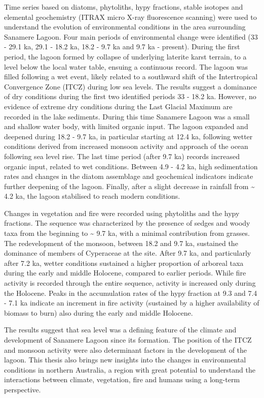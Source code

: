 \documentclass[
  12pt,
]{book}
\begin{document}
Time series based on diatoms, phytoliths, hypy fractions, stable isotopes and elemental geochemistry (ITRAX micro X-ray fluorescence scanning) were used to understand the evolution of environmental conditions in the area surrounding Sanamere Lagoon. Four main periods of environmental change were identified (33 - 29.1 ka, 29.1 - 18.2 ka, 18.2 - 9.7 ka and 9.7 ka - present). During the first period, the lagoon formed by collapse of underlying laterite karst terrain, to a level below the local water table, ensuing a continuous record. The lagoon was filled following a wet event, likely related to a southward shift of the Intertropical Convergence Zone (ITCZ) during low sea levels. The results suggest a dominance of dry conditions during the first two identified periods 33 - 18.2 ka. However, no evidence of extreme dry conditions during the Last Glacial Maximum are recorded in the lake sediments. During this time Sanamere Lagoon was a small and shallow water body, with limited organic input. The lagoon expanded and deepened during 18.2 - 9.7 ka, in particular starting at 12.4 ka, following wetter conditions derived from increased monsoon activity and approach of the ocean following sea level rise. The last time period (after 9.7 ka) records increased organic input, related to wet conditions. Between 4.9 - 4.2 ka, high sedimentation rates and changes in the diatom assemblage and geochemical indicators indicate further deepening of the lagoon. Finally, after a slight decrease in rainfall from \textasciitilde{} 4.2 ka, the lagoon stabilised to reach modern conditions.

Changes in vegetation and fire were recorded using phytoliths and the hypy fractions. The sequence was characterized by the presence of sedges and woody taxa from the beginning to \textasciitilde{} 9.7 ka, with a minimal contribution from grasses. The redevelopment of the monsoon, between 18.2 and 9.7 ka, sustained the dominance of members of Cyperaceae at the site. After 9.7 ka, and particularly after 7.2 ka, wetter conditions sustained a higher proportion of arboreal taxa during the early and middle Holocene, compared to earlier periods. While fire activity is recorded through the entire sequence, activity is increased only during the Holocene. Peaks in the accumulation rates of the hypy fraction at 9.3 and 7.4 - 7.1 ka indicate an increment in fire activity (sustained by a higher availability of biomass to burn) also during the early and middle Holocene.

The results suggest that sea level was a defining feature of the climate and development of Sanamere Lagoon since its formation. The position of the ITCZ and monsoon activity were also determinant factors in the development of the lagoon. This thesis also brings new insights into the changes in environmental conditions in northern Australia, a region with great potential to understand the interactions between climate, vegetation, fire and humans using a long-term perspective.
\end{document}
